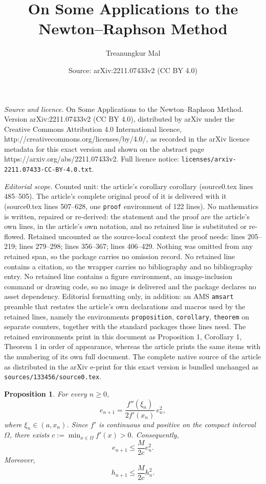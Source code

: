 \documentclass[10pt,a4paper]{amsart}
\title{On Some Applications to the Newton--Raphson Method}
\author{Treanungkur Mal}
\date{Source: arXiv:2211.07433v2 (CC BY 4.0)}
\newtheorem{proposition}{Proposition}
\begin{document}
\maketitle

\noindent\emph{Source and licence.} On Some Applications to the Newton--Raphson Method. Version arXiv:2211.07433v2 (CC BY 4.0), distributed by arXiv under the Creative Commons Attribution 4.0 International licence, http://creativecommons.org/licenses/by/4.0/, as recorded in the arXiv licence metadata for this exact version and shown on the abstract page https://arxiv.org/abs/2211.07433v2. Full licence notice: \texttt{licenses/arxiv-2211.07433-CC-BY-4.0.txt}.\par\smallskip

\noindent\textit{Editorial scope.} Counted unit: the article's corollary corollary (source0.tex lines 485--505). The article's complete original proof of it is delivered with it (source0.tex lines 507--628, one \texttt{proof} environment of 122 lines). No mathematics is written, repaired or re-derived: the statement and the proof are the article's own lines, in the article's own notation, and no retained line is substituted or re-flowed.  Retained uncounted as the source-local context the proof needs: lines 205--219; lines 279--298; lines 356--367; lines 406--429.  Nothing was omitted from any retained span, so the package carries no omission record.  No retained line contains a citation, so the wrapper carries no bibliography and no bibliography entry.  No retained line contains a figure environment, an image-inclusion command or drawing code, so no image is delivered and the package declares no asset dependency.  Editorial formatting only, in addition: an AMS \texttt{amsart} preamble that restates the article's own declarations and macros used by the retained lines, namely the environments \texttt{proposition}, \texttt{corollary}, \texttt{theorem} on separate counters, together with the standard packages those lines need.  The retained environments print in this document as Proposition 1, Corollary 1, Theorem 1 in order of appearance, whereas the article prints the same items with the numbering of its own full document.  The complete native source of the article as distributed in the arXiv e-print for this exact version is bundled unchanged as \texttt{sources/133456/source0.tex}.
\begin{proposition}\label{prop: 2,1}
For every $n\ge0$,
\[
e_{n+1}
=\frac{f''(\xi_n)}{2f'(x_n)}\,e_n^2,
\]
where $\xi_n\in(a,x_n)$. Since $f'$ is continuous and positive on the compact interval $\Omega$, there exists $c:=\min_{x\in\Omega}f'(x)>0$. Consequently,
\[
e_{n+1}\le\frac{M}{2c}e_n^2.
\]
Moreover,
\[
h_{n+1}\le\frac{M}{2c}h_n^2.
\]
\end{proposition}
\end{document}
